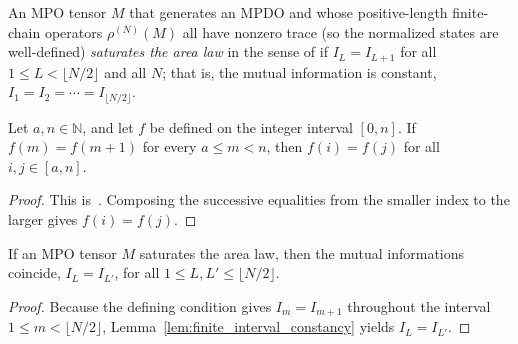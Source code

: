 \begin{definition}\label{def:is_sal}
    \leanok
    An MPO tensor $M$ that generates an MPDO and whose positive-length
    finite-chain operators $\rho^{(N)}(M)$ all have nonzero trace (so the normalized states are
    well-defined) \emph{saturates the area law} in the sense of
    \cite[Definition~4.6, line~811]{Cirac2016MPDO_arXiv} if
    $I_L=I_{L+1}$ for all $1\le L<\lfloor N/2\rfloor$ and all $N$; that is,
    the mutual information is constant,
    $I_1=I_2=\cdots=I_{\lfloor N/2\rfloor}$.
\end{definition}

\begin{lemma}
    \label{lem:finite_interval_constancy}
    \leanok
    Let $a,n\in\mathbb N$, and let $f$ be defined on the integer interval
    $[0,n]$. If $f(m)=f(m+1)$ for every $a\le m<n$, then $f(i)=f(j)$ for all
    $i,j\in[a,n]$.
\end{lemma}
\begin{proof}\leanok
    This is~\cite[``Constancy on a finite interval'']{QICLean2026Blueprint}.
    Composing the successive equalities from the smaller index to the larger
    gives $f(i)=f(j)$.
\end{proof}

\begin{lemma}
    \label{lem:sal_const}
    \leanok
    If an MPO tensor $M$ saturates the area law, then the mutual informations
    coincide, $I_L=I_{L'}$, for all
    $1\le L,L'\le\lfloor N/2\rfloor$.
\end{lemma}
\begin{proof}\leanok
    Because the defining condition gives $I_m=I_{m+1}$ throughout the interval
    $1\le m<\lfloor N/2\rfloor$, Lemma~\ref{lem:finite_interval_constancy}
    yields $I_L=I_{L'}$.
\end{proof}

